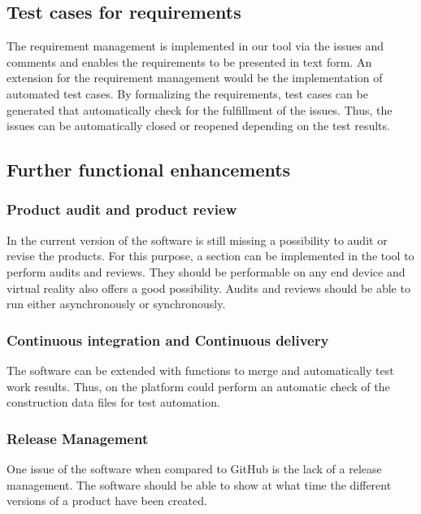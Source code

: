 \subsection*{Test cases for requirements}

The requirement management is implemented in our tool via the issues and comments and enables the requirements to be presented in text form. An extension for the requirement management would be the implementation of automated test cases. By formalizing the requirements, test cases can be generated that automatically check for the fulfillment of the issues. Thus, the issues can be automatically closed or reopened depending on the test results.

\subsection*{Further functional enhancements}

\subsubsection*{Product audit and product review}

In the current version of the software is still missing a possibility to audit or revise the products. For this purpose, a section can be implemented in the tool to perform audits and reviews. 
They should be performable on any end device and virtual reality also offers a good possibility. Audits and reviews should be able to run either asynchronously or synchronously.

\subsubsection*{Continuous integration and Continuous delivery}

The software can be extended with functions to merge and automatically test work results.
Thus, on the platform could perform an automatic check of the construction data files for test automation.

\subsubsection*{Release Management}

One issue of the software when compared to GitHub is the lack of a release management. The software should be able to show at what time the different versions of a product have been created.